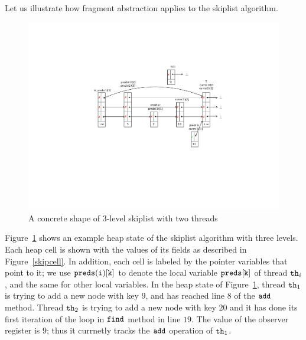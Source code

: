 Let us illustrate how fragment abstraction applies to the skiplist
algorithm.
\begin{figure}
\center  
 \includegraphics[width=1.2\textwidth, trim={7cm 8cm 0.5cm 6cm}, clip]{skipshape.pdf}  
 \caption{A concrete shape of 3-level skiplist with two threads}
\label{sl-shape}
\end{figure}
Figure~\ref{sl-shape} shows an example heap state of the
skiplist algorithm with three levels. Each heap cell is shown with the values of its fields as described in Figure~\ref{skipcell}. %
In addition, each cell is labeled by the
pointer variables that point to it; we use ${\tt preds(i)[k]}$ to denote the local
variable ${\tt preds[k]}$ of thread ${\tt th}_i$, and the same for other local variables.
In the heap state of Figure~\ref{sl-shape}, thread ${\tt th}_1$ is trying to add a new node with key $9$, and has reached line $8$ of the $\tt add$ method. Thread ${\tt th}_2$ is trying to add a new node with key $20$ and it has done its first iteration of the loop in $\tt find$ method in line $19$. The value of the observer register is $9$; thus it currnetly tracks the $\tt add$ operation of ${\tt th}_1$.





